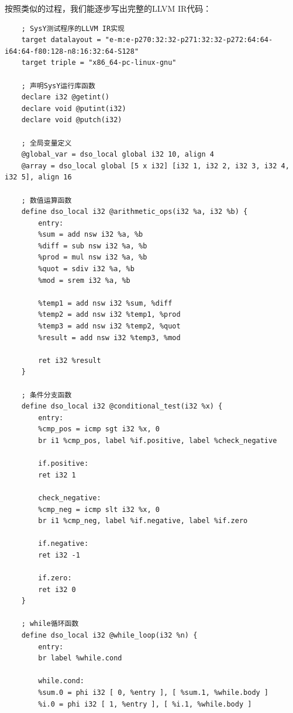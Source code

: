 \documentclass[a4paper]{article}
\begin{document}
按照类似的过程，我们能逐步写出完整的LLVM IR代码：
\begin{lstlisting}
	; SysY测试程序的LLVM IR实现
	target datalayout = "e-m:e-p270:32:32-p271:32:32-p272:64:64-i64:64-f80:128-n8:16:32:64-S128"
	target triple = "x86_64-pc-linux-gnu"
	
	; 声明SysY运行库函数
	declare i32 @getint()
	declare void @putint(i32)
	declare void @putch(i32)
	
	; 全局变量定义
	@global_var = dso_local global i32 10, align 4
	@array = dso_local global [5 x i32] [i32 1, i32 2, i32 3, i32 4, i32 5], align 16
	
	; 数值运算函数
	define dso_local i32 @arithmetic_ops(i32 %a, i32 %b) {
		entry:
		%sum = add nsw i32 %a, %b
		%diff = sub nsw i32 %a, %b
		%prod = mul nsw i32 %a, %b
		%quot = sdiv i32 %a, %b
		%mod = srem i32 %a, %b
		
		%temp1 = add nsw i32 %sum, %diff
		%temp2 = add nsw i32 %temp1, %prod
		%temp3 = add nsw i32 %temp2, %quot
		%result = add nsw i32 %temp3, %mod
		
		ret i32 %result
	}
	
	; 条件分支函数
	define dso_local i32 @conditional_test(i32 %x) {
		entry:
		%cmp_pos = icmp sgt i32 %x, 0
		br i1 %cmp_pos, label %if.positive, label %check_negative
		
		if.positive:
		ret i32 1
		
		check_negative:
		%cmp_neg = icmp slt i32 %x, 0
		br i1 %cmp_neg, label %if.negative, label %if.zero
		
		if.negative:
		ret i32 -1
		
		if.zero:
		ret i32 0
	}
	
	; while循环函数
	define dso_local i32 @while_loop(i32 %n) {
		entry:
		br label %while.cond
		
		while.cond:
		%sum.0 = phi i32 [ 0, %entry ], [ %sum.1, %while.body ]
		%i.0 = phi i32 [ 1, %entry ], [ %i.1, %while.body ]
		

\end{lstlisting}
\end{document}
